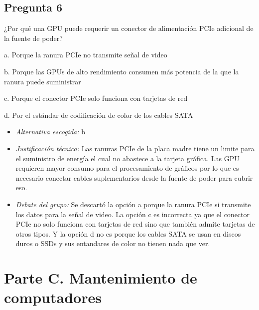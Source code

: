 \documentclass{article}
\begin{document}
\subsection{Pregunta 6}
\label{sec:orga7e8ca6}
¿Por qué una GPU puede requerir un conector de alimentación PCIe adicional de la fuente de poder?

a. Porque la ranura PCIe no transmite señal de video

b. Porque las GPUs de alto rendimiento consumen más potencia de la que la ranura puede suministrar

c. Porque el conector PCIe solo funciona con tarjetas de red

d. Por el estándar de codificación de color de los cables SATA

\begin{itemize}
\item \emph{Alternativa escogida:} b
\item \emph{Justificación técnica:} Las ranuras PCIe de la placa madre tiene un limite para el suministro de energía el cual no abastece a la tarjeta gráfica. Las GPU requieren mayor consumo para el procesamiento de gráficos por lo que es necesario conectar cables suplementarios desde la fuente de poder para cubrir eso.
\item \emph{Debate del grupo:} Se descartó la opción a porque la ranura PCIe si transmite los datos para la señal de video. La opción c es incorrecta ya que el conector PCIe no solo funciona con tarjetas de red sino que también admite tarjetas de otros tipos. Y la opción d no es porque los cables SATA se usan en discos duros o SSDs y sus entandares de color no tienen nada que ver.
\end{itemize}
\section{Parte C. Mantenimiento de computadores}
\label{sec:org9c97716}
\end{document}
